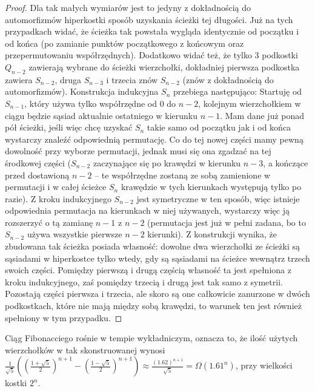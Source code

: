 \documentclass{pracamgr}
\begin{document}
\begin{proof}
     Dla tak małych wymiarów jest to jedyny z dokładnością do automorfizmów hiperkostki sposób uzyskania ścieżki tej długości.
     Już na tych przypadkach widać, że ścieżka tak powstała wygląda identycznie od początku i od końca
     (po zamianie punktów początkowego z końcowym oraz przepermutowaniu współrzędnych). Dodatkowo widać też,
     że tylko 3 podkostki $Q_{n-2}$ zawierają wybrane do ścieżki wierzchołki, dokładniej pierwsza podkostka zawiera $S_{n-2}$, druga $S_{n-3}$
     i trzecia znów $S_{n-2}$ (znów z dokładnością do automorfizmów).\newline
     Konstrukcja indukcyjna $S_n$ przebiega następująco:\newline
     Startuję od $S_{n-1}$, który używa tylko współrzędne od $0$ do $n-2$, kolejnym wierzchołkiem w ciągu będzie sąsiad aktualnie ostatniego w kierunku
     $n-1$. Mam dane już ponad pół ścieżki, jeśli więc chcę uzyskać $S_n$ takie samo od początku jak i od końca wystarczy znaleźć odpowiednią permutację.
     Co do tej nowej części mamy pewną dowolność przy wyborze permutacji, jednak musi się ona zgadzać na tej środkowej części
     ($S_{n-2}$ zaczynające się po krawędzi w kierunku $n-3$, a kończące przed dostawioną $n-2$ -- te współrzędne zostaną ze sobą zamienione w permutacji
     i w całej ścieżce $S_n$ krawędzie w tych kierunkach występują tylko po razie). Z kroku indukcyjnego $S_{n-2}$ jest symetryczne w ten sposób,
     więc istnieje odpowiednia permutacja na kierunkach w niej używanych, wystarczy więc ją rozszerzyć o tą zamianę $n-1$ z $n-2$
     (permutacja jest już w pełni zadana, bo to $S_{n-2}$ używa wszystkie pierwsze $n-2$ kierunki).
     Z konstrukcji wynika, że zbudowana tak ścieżka posiada własność: dowolne dwa wierzchołki ze ścieżki są sąsiadami w hiperkostce
     tylko wtedy, gdy są sąsiadami na ścieżce wewnątrz trzech swoich części. Pomiędzy pierwszą i drugą częścią własność ta jest spełniona z kroku indukcyjnego,
     zaś pomiędzy trzecią i drugą jest tak samo z symetrii. Pozostają części pierwsza i trzecia, ale skoro są one całkowicie zanurzone w dwóch podkostkach,
     które nie mają między sobą krawędzi, to warunek ten jest również spełniony w tym przypadku.
    \end{proof}
     Ciąg Fibonacciego rośnie w tempie wykładniczym, oznacza to, że ilość użytych wierzchołków w tak skonstruowanej wynosi
     $\frac{1}{\sqrt{5}}((\frac{1+\sqrt{5}}{2})^{n+1}-(\frac{1-\sqrt{5}}{2})^{n+1})\approx \frac{(1.62)^{n+1}}{\sqrt{5}}=\Omega(1.61^n)$, przy wielkości kostki $2^n$.
\end{document}
